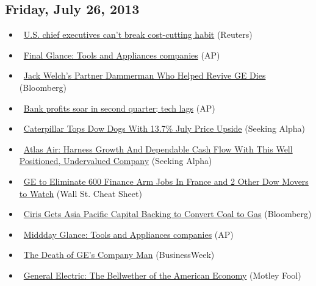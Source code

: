 \documentclass[11pt,asymmetric]{article}
\begin{document}
\subsection*{Friday, July 26, 2013}
\begin{itemize}
\item\ \href{http://finance.yahoo.com/news/analysis-u-chief-executives-cant-214632019.html}{U.S. chief executives can't break cost-cutting habit} (Reuters)
\item\ \href{http://finance.yahoo.com/news/final-glance-tools-appliances-companies-230402056.html}{Final Glance: Tools and Appliances companies} (AP)
\item\ \href{http://www.bloomberg.com/news/2013-07-26/jack-welch-s-partner-dammerman-who-helped-revive-ge-dies.html?cmpid=yhoo}{Jack Welch’s Partner Dammerman Who Helped Revive GE Dies} (Bloomberg)
\item\ \href{http://finance.yahoo.com/news/bank-profits-soar-second-quarter-205429461.html}{Bank profits soar in second quarter; tech lags} (AP)
\item\ \href{http://seekingalpha.com/article/1577132-caterpillar-tops-dow-dogs-with-13-7-july-price-upside?source=yahoo}{Caterpillar Tops Dow Dogs With 13.7\% July Price Upside} (Seeking Alpha)
\item\ \href{http://seekingalpha.com/article/1576752-atlas-air-harness-growth-and-dependable-cash-flow-with-this-well-positioned-undervalued-company?source=yahoo}{Atlas Air: Harness Growth And Dependable Cash Flow With This Well Positioned, Undervalued Company} (Seeking Alpha)
\item\ \href{http://wallstcheatsheet.com/stocks/ge-to-eliminate-600-finance-arm-jobs-in-france-and-2-other-dow-movers-to-watch.html/?ref=YF}{GE to Eliminate 600 Finance Arm Jobs In France and 2 Other Dow Movers to Watch} (Wall St. Cheat Sheet)
\item\ \href{http://www.bloomberg.com/news/2013-07-26/ciris-gets-asia-pacific-capital-backing-to-convert-coal-to-gas.html?cmpid=yhoo}{Ciris Gets Asia Pacific Capital Backing to Convert Coal to Gas} (Bloomberg)
\item\ \href{http://finance.yahoo.com/news/middday-glance-tools-appliances-companies-182208279.html}{Middday Glance: Tools and Appliances companies} (AP)
\item\ \href{http://www.businessweek.com/articles/2013-07-26/the-death-of-ges-company-man?campaign_id=yhoo}{The Death of GE's Company Man} (BusinessWeek)
\item\ \href{http://beta.fool.com/sentiment007/2013/07/26/general-electric-the-bellweather-of-the-american-e/41401/?source=eogyholnk0000001}{General Electric: The Bellwether of the American Economy} (Motley Fool)

\end{itemize}
\end{document}
